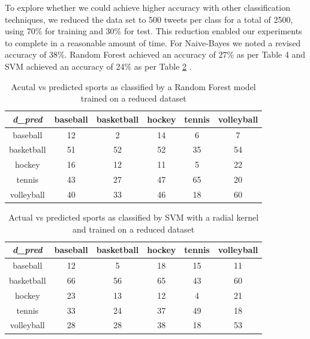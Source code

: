 \documentclass[journal, a4paper]{IEEEtran}
\begin{document}
To explore whether we could achieve higher accuracy with other classification techniques, we reduced the data set to 500 tweets per class for a total of 2500, using 70\% for training and 30\% for test. This reduction enabled our experiments to complete in a reasonable amount of time. For Naive-Bayes we noted a revised accuracy of 38\%. Random Forest achieved an accuracy of 27\% as per Table 4 and SVM achieved an accuracy of 24\% as per Table \ref{Tab:5} .
\begin{table}[ht]
	\begin{center}
		\begin{tabular}{|c|c c c c c|}
			\hline
			\textit{d\_pred}& baseball & basketball & hockey & tennis& volleyball\\
			\hline
			baseball &12&2&14&6&7\\
			basketball &51&52&52&35&54\\
			hockey &16&12&11&5&22\\
			tennis &43&27&47&65&20\\
			volleyball&40&33&46&18&60\\
			\hline
		\end{tabular}
	\end{center}
	\caption{Acutal vs predicted sports as classified by a Random Forest model trained on a reduced dataset}\label{Tab:4}
\end{table}
\begin{table}[ht]
	\begin{center}
		\begin{tabular}{|c|c c c c c|}
			\hline
			\textit{d\_pred}& baseball & basketball & hockey & tennis& volleyball\\
			\hline
			baseball &12&5&18&15&11\\
			basketball &66&56&65&43&60\\
			hockey &23&13&12&4&21\\
			tennis &33&24&37&49&18\\
			volleyball&28&28&38&18&53\\
			\hline
		\end{tabular}
	\end{center}
	\caption{Actual vs predicted sports as classified by SVM with a radial kernel and trained on a reduced dataset}\label{Tab:5}
\end{table}
\end{document}
